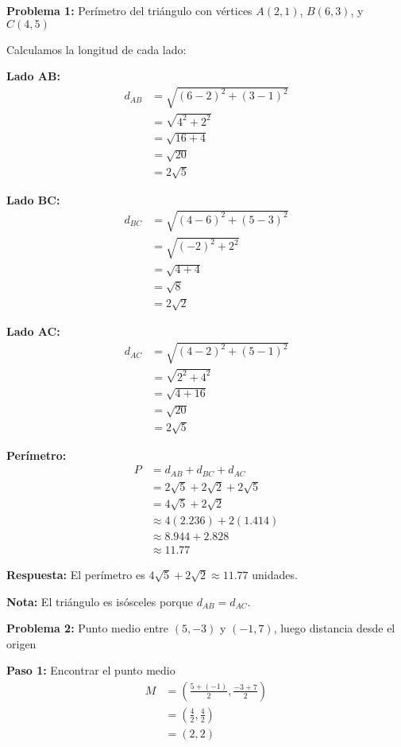 \textbf{Problema 1:} Perímetro del triángulo con vértices $A(2, 1)$, $B(6, 3)$, y $C(4, 5)$

Calculamos la longitud de cada lado:

\textbf{Lado AB:}
\begin{align*}
d_{AB} &= \sqrt{(6-2)^2 + (3-1)^2} \\
       &= \sqrt{4^2 + 2^2} \\
       &= \sqrt{16 + 4} \\
       &= \sqrt{20} \\
       &= 2\sqrt{5}
\end{align*}

\textbf{Lado BC:}
\begin{align*}
d_{BC} &= \sqrt{(4-6)^2 + (5-3)^2} \\
       &= \sqrt{(-2)^2 + 2^2} \\
       &= \sqrt{4 + 4} \\
       &= \sqrt{8} \\
       &= 2\sqrt{2}
\end{align*}

\textbf{Lado AC:}
\begin{align*}
d_{AC} &= \sqrt{(4-2)^2 + (5-1)^2} \\
       &= \sqrt{2^2 + 4^2} \\
       &= \sqrt{4 + 16} \\
       &= \sqrt{20} \\
       &= 2\sqrt{5}
\end{align*}

\textbf{Perímetro:}
\begin{align*}
P &= d_{AB} + d_{BC} + d_{AC} \\
  &= 2\sqrt{5} + 2\sqrt{2} + 2\sqrt{5} \\
  &= 4\sqrt{5} + 2\sqrt{2} \\
  &\approx 4(2.236) + 2(1.414) \\
  &\approx 8.944 + 2.828 \\
  &\approx 11.77
\end{align*}

\textbf{Respuesta:} El perímetro es $4\sqrt{5} + 2\sqrt{2} \approx 11.77$ unidades.

\textbf{Nota:} El triángulo es isósceles porque $d_{AB} = d_{AC}$.

\medskip

\textbf{Problema 2:} Punto medio entre $(5, -3)$ y $(-1, 7)$, luego distancia desde el origen

\textbf{Paso 1:} Encontrar el punto medio
\begin{align*}
M &= \left(\frac{5 + (-1)}{2}, \frac{-3 + 7}{2}\right) \\
  &= \left(\frac{4}{2}, \frac{4}{2}\right) \\
  &= (2, 2)
\end{align*}

